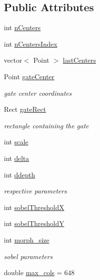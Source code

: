 \subsection*{Public Attributes}
\begin{DoxyCompactItemize}
\item 
int \hyperlink{classBlueBinDetector_aa5ee31b4f78070d90c96360e70c2710e}{n\+Centers}
\item 
int \hyperlink{classBlueBinDetector_aa32db58c1084261fc82510a1f7647dd4}{n\+Centers\+Index}
\item 
vector$<$ Point $>$ \hyperlink{classBlueBinDetector_a3f15b441edbe4a372c25a2a14e5dd238}{last\+Centers}
\item 
Point \hyperlink{classBlueBinDetector_aaa3974bddf370c5f3054b8b28018d935}{gate\+Center}
\begin{DoxyCompactList}\small\item\em gate center coordinates \end{DoxyCompactList}\item 
Rect \hyperlink{classBlueBinDetector_a2c467050d739ce4b5f17776dc1acff99}{gate\+Rect}
\begin{DoxyCompactList}\small\item\em rectangle containing the gate \end{DoxyCompactList}\item 
int \hyperlink{classBlueBinDetector_a27c2322e9231eada3fd026d8b4859b55}{scale}
\item 
int \hyperlink{classBlueBinDetector_aaceda035648f9c683f999a0180bc8d06}{delta}
\item 
int \hyperlink{classBlueBinDetector_a28df18b6bb12bdf794a26c10bcf85397}{ddepth}
\begin{DoxyCompactList}\small\item\em respective parameters \end{DoxyCompactList}\item 
int \hyperlink{classBlueBinDetector_af8ec4d3b2864d710e7d9ac9904112d09}{sobel\+ThresholdX}
\item 
int \hyperlink{classBlueBinDetector_ac032afb6b48bac1eeb42b403639f658a}{sobel\+ThresholdY}
\item 
int \hyperlink{classBlueBinDetector_af0495b5bbc1c64cde69868bbbac6abac}{morph\+\_\+size}
\begin{DoxyCompactList}\small\item\em sobel parameters \end{DoxyCompactList}\item 
double \hyperlink{classBlueBinDetector_a3d8f5991f9e6c26469aa38ae3e745d37}{max\+\_\+cols} = 648

\end{DoxyCompactItemize}
